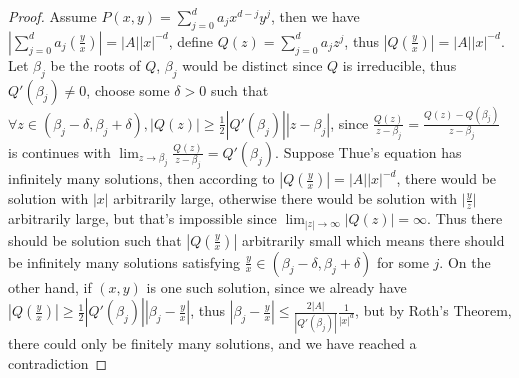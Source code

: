 \begin{proof}
Assume $ P(x,y)=\sum_{j=0}^{d} a_{j}x^{d-j}y^{j} $, then we have $ \left|\sum_{j=0}^{d} a_{j}\left(\frac{y}{x}\right)\right|=|A||x|^{-d} $, define $ Q(z)=\sum_{j=0}^{d}a_{j}z^{j} $, 
thus $ \left|Q\left(\frac{y}{x}\right)\right|=|A||x|^{-d} $. Let $ \beta_{j} $ be the roots of $ Q $, $ \beta_{j} $ would be distinct since $ Q $ is irreducible, thus $ Q'(\beta_{j}) \neq 0 $, choose some $ \delta>0 $ such that $ \forall z\in(\beta_{j}-\delta,\beta_{j}+\delta), |Q(z)|\geq\frac{1}{2}|Q'(\beta_{j})||z-\beta_{j}| $, since $ \frac{Q(z)}{z-\beta_{j}}=\frac{Q(z)-Q(\beta_{j})}{z-\beta_{j}} $ is continues with $ \lim_{z\to\beta_{j}}\frac{Q(z)}{z-\beta_{j}}=Q'(\beta_{j}) $. Suppose Thue's equation has infinitely many solutions, then according to $ \left|Q\left(\frac{y}{x}\right)\right|=|A||x|^{-d} $, there would be solution with $ |x| $ arbitrarily large, otherwise there would be solution with $ \Big|\frac{y}{z}\Big| $ arbitrarily large, but that's impossible since $ \lim_{|z|\to\infty}|Q(z)|=\infty $. Thus there should be solution such that $ \left|Q\left(\frac{y}{x}\right)\right| $ arbitrarily small which means there should be infinitely many solutions 
satisfying $ \frac{y}{x}\in(\beta_{j}-\delta,\beta_{j}+\delta) $ for some $ j $. On the other hand, if $ (x,y) $ is one such solution, since we already have 
$ \left|Q\left(\frac{y}{x}\right)\right| \geq \frac{1}{2}|Q'(\beta_{j})|\left|\beta_{j}-\frac{y}{x}\right| $, thus $ \left|\beta_{j}-\frac{y}{x}\right| \leq \frac{2|A|}{|Q'(\beta_{j})|}\frac{1}{|x|^{d}} $, but by Roth's Theorem, there could only be finitely many solutions, and we have reached a contradiction
\end{proof}